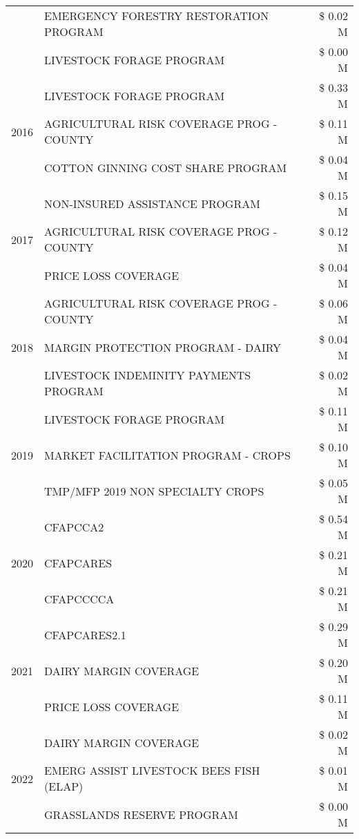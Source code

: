 \begin{tabular}{llr}
 & EMERGENCY FORESTRY RESTORATION PROGRAM & \$ 0.02 M \\
 & LIVESTOCK FORAGE PROGRAM & \$ 0.00 M \\
\cline{1-3}
\multirow[t]{3}{*}{2016} & LIVESTOCK FORAGE PROGRAM & \$ 0.33 M \\
 & AGRICULTURAL RISK COVERAGE PROG - COUNTY & \$ 0.11 M \\
 & COTTON GINNING COST SHARE PROGRAM & \$ 0.04 M \\
\cline{1-3}
\multirow[t]{3}{*}{2017} & NON-INSURED ASSISTANCE PROGRAM & \$ 0.15 M \\
 & AGRICULTURAL RISK COVERAGE PROG - COUNTY & \$ 0.12 M \\
 & PRICE LOSS COVERAGE & \$ 0.04 M \\
\cline{1-3}
\multirow[t]{3}{*}{2018} & AGRICULTURAL RISK COVERAGE PROG - COUNTY & \$ 0.06 M \\
 & MARGIN PROTECTION PROGRAM - DAIRY & \$ 0.04 M \\
 & LIVESTOCK INDEMINITY PAYMENTS PROGRAM & \$ 0.02 M \\
\cline{1-3}
\multirow[t]{3}{*}{2019} & LIVESTOCK FORAGE PROGRAM & \$ 0.11 M \\
 & MARKET FACILITATION PROGRAM - CROPS & \$ 0.10 M \\
 & TMP/MFP 2019 NON SPECIALTY CROPS & \$ 0.05 M \\
\cline{1-3}
\multirow[t]{3}{*}{2020} & CFAPCCA2 & \$ 0.54 M \\
 & CFAPCARES & \$ 0.21 M \\
 & CFAPCCCCA & \$ 0.21 M \\
\cline{1-3}
\multirow[t]{3}{*}{2021} & CFAPCARES2.1 & \$ 0.29 M \\
 & DAIRY MARGIN COVERAGE & \$ 0.20 M \\
 & PRICE LOSS COVERAGE & \$ 0.11 M \\
\cline{1-3}
\multirow[t]{3}{*}{2022} & DAIRY MARGIN COVERAGE & \$ 0.02 M \\
 & EMERG ASSIST LIVESTOCK BEES FISH (ELAP) & \$ 0.01 M \\
 & GRASSLANDS RESERVE PROGRAM & \$ 0.00 M \\
\cline{1-3}
\bottomrule
\end{tabular}
